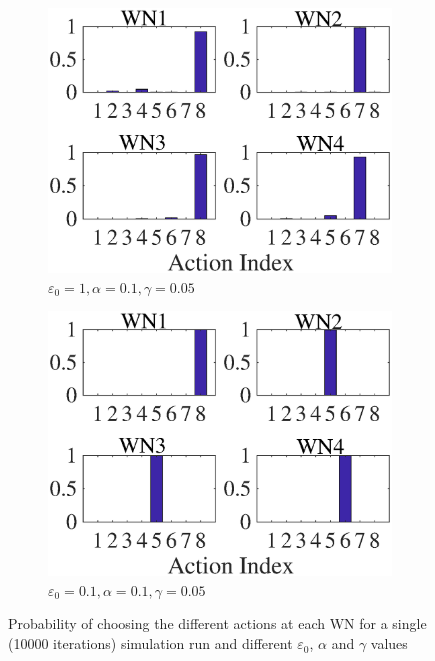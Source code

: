 \documentclass[conference]{IEEEtran}
\begin{document}
\begin{figure}[]
\begin{subfigure}[b]{0.225\textwidth}
			\includegraphics[width=\textwidth]{images/e_1_a_01_g_005}
			\caption{$\varepsilon_0=1, \alpha=0.1, \gamma=0.05$}
			\label{fig:e_1_a_01_g_005}
		\end{subfigure}
		\begin{subfigure}[b]{0.225\textwidth}
			\includegraphics[width=\textwidth]{images/e_01_a_01_g_005}
			\caption{$\varepsilon_0=0.1, \alpha=0.1, \gamma=0.05$}
			\label{fig:e_01_a_01_g_005}
		\end{subfigure}
		\caption{Probability of choosing the different actions at each WN for a single (10000 iterations) simulation run and different $\varepsilon_0$, $\alpha$ and $\gamma$ values}
		\label{fig:ql_params_eval_actions_prob}
	\end{figure}
	
\end{document}
